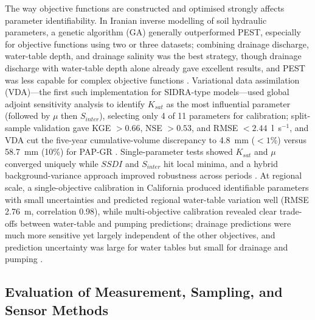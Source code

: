 The way objective functions are constructed and optimised strongly affects
parameter identifiability. In Iranian inverse modelling of soil hydraulic
parameters, a genetic algorithm (GA) generally outperformed PEST, especially for
objective functions using two or three datasets; combining drainage discharge,
water-table depth, and drainage salinity was the best strategy, though drainage
discharge with water-table depth alone already gave excellent results, and PEST
was less capable for complex objective functions \parencite{Sedaghatdoost2019}.
Variational data assimilation (VDA)---the first such implementation for
SIDRA-type models---used global adjoint sensitivity analysis to identify
$K_{sat}$ as the most influential parameter (followed by $\mu$ then $S_{inter}$),
selecting only 4 of 11 parameters for calibration; split-sample validation gave
KGE $>0.66$, NSE $>0.53$, and RMSE $<2.44$~l~s$^{-1}$, and VDA cut the five-year
cumulative-volume discrepancy to 4.8~mm ($<1$\%) versus 58.7~mm (10\%) for
PAP-GR \parencite{Chelil2022b}. Single-parameter tests showed $K_{sat}$ and
$\mu$ converged uniquely while $SSDI$ and $S_{inter}$ hit local minima, and a
hybrid background-variance approach improved robustness across periods
\parencite{Chelil2022b}. At regional scale, a single-objective calibration in
California produced identifiable parameters with small uncertainties and
predicted regional water-table variation well (RMSE 2.76~m, correlation 0.98),
while multi-objective calibration revealed clear trade-offs between water-table
and pumping predictions; drainage predictions were much more sensitive yet
largely independent of the other objectives, and prediction uncertainty was
large for water tables but small for drainage and pumping \parencite{Schoups2005}.

\subsection{Evaluation of Measurement, Sampling, and Sensor Methods}

